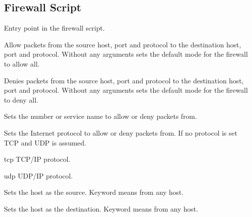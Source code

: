 \subsection{Firewall Script}



Entry point in the firewall script.


Allow packets from the source host, port and protocol to the destination
host, port and protocol. Without any arguments sets the default mode for the 
firewall to allow all.


Denies packets from the source host, port and protocol to the destination
host, port and protocol.
Without any arguments sets the default mode for the firewall to deny all.


Sets the  number or service name to allow or deny packets from.


Sets the Internet protocol to allow or deny packets from. If no protocol
is set TCP and UDP is assumed.

\begin{compactdesc}
\item[tcp] TCP/IP protocol.
\item[udp] UDP/IP protocol.
\end{compactdesc}


Sets the host as the source. Keyword  means from any host.


Sets the host as the destination. Keyword  means from any host.

